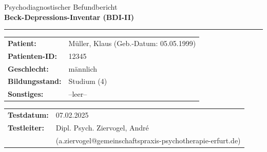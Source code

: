 \documentclass{article}
\newcommand{\rightmarginwidth}{50mm}
\newcommand{\leftmarginwidth}{10mm}
\newcommand{\footerdistance}{15mm} %
\newlength{\extendedrightmargin}
\begin{document}
\newcommand{\textblockwidth}{\dimexpr\textwidth\relax}
\setlength{\parindent}{0pt}
\setlength{\parskip}{0pt}

  \begin{minipage}{\textblockwidth}


  {\fontsize{12}{14}\selectfont
  \begin{flushleft}
    {\large Psychodiagnostischer Befundbericht} \\[2mm]
    {\LARGE\textbf{Beck-Depressions-Inventar (BDI-II)}} \\[2mm]
    \rule{\textwidth}{0.4pt}
  \end{flushleft}\vspace{-0.5mm}
\begin{flushleft}
{\small
\begin{tabular}{@{}p{35mm}l@{}} %
\textbf{Patient:} & Müller, Klaus (Geb.-Datum: 05.05.1999) \\[2mm]
\textbf{Patienten-ID:} & 12345 \\[2mm]
\textbf{Geschlecht:} & männlich \\ [2mm]
\textbf{Bildungsstand:} & Studium (4) \\[2mm]
\textbf{Sonstiges:} & --leer-- \\[4mm]
\end{tabular}

\vspace{5mm} %

\begin{tabular}{@{}p{35mm}l@{}} %
\textbf{Testdatum:} & 07.02.2025 \\[2mm]
\textbf{Testleiter:} & Dipl. Psych. Ziervogel, André \\
                     & (a.ziervogel@gemeinschaftspraxis-psychotherapie-erfurt.de)
\end{tabular}
}
\end{flushleft} }
\end{minipage}
  
\end{document}
